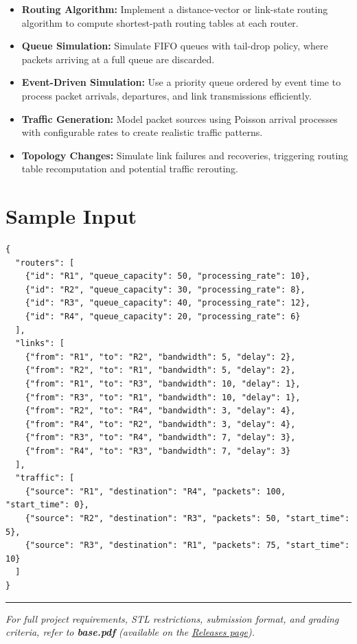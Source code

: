 \begin{itemize}
  \item \textbf{Routing Algorithm:} Implement a distance-vector or link-state routing algorithm to compute shortest-path routing tables at each router.
  \item \textbf{Queue Simulation:} Simulate FIFO queues with tail-drop policy, where packets arriving at a full queue are discarded.
  \item \textbf{Event-Driven Simulation:} Use a priority queue ordered by event time to process packet arrivals, departures, and link transmissions efficiently.
  \item \textbf{Traffic Generation:} Model packet sources using Poisson arrival processes with configurable rates to create realistic traffic patterns.
  \item \textbf{Topology Changes:} Simulate link failures and recoveries, triggering routing table recomputation and potential traffic rerouting.
\end{itemize}

\section{Sample Input}

\begin{lstlisting}[style=json, caption={data/input\_sample.json}]
{
  "routers": [
    {"id": "R1", "queue_capacity": 50, "processing_rate": 10},
    {"id": "R2", "queue_capacity": 30, "processing_rate": 8},
    {"id": "R3", "queue_capacity": 40, "processing_rate": 12},
    {"id": "R4", "queue_capacity": 20, "processing_rate": 6}
  ],
  "links": [
    {"from": "R1", "to": "R2", "bandwidth": 5, "delay": 2},
    {"from": "R2", "to": "R1", "bandwidth": 5, "delay": 2},
    {"from": "R1", "to": "R3", "bandwidth": 10, "delay": 1},
    {"from": "R3", "to": "R1", "bandwidth": 10, "delay": 1},
    {"from": "R2", "to": "R4", "bandwidth": 3, "delay": 4},
    {"from": "R4", "to": "R2", "bandwidth": 3, "delay": 4},
    {"from": "R3", "to": "R4", "bandwidth": 7, "delay": 3},
    {"from": "R4", "to": "R3", "bandwidth": 7, "delay": 3}
  ],
  "traffic": [
    {"source": "R1", "destination": "R4", "packets": 100, "start_time": 0},
    {"source": "R2", "destination": "R3", "packets": 50, "start_time": 5},
    {"source": "R3", "destination": "R1", "packets": 75, "start_time": 10}
  ]
}
\end{lstlisting}

\vfill
\noindent\rule{\textwidth}{0.4pt}
{\small\textit{For full project requirements, STL restrictions, submission format, and grading criteria, refer to \textbf{base.pdf} (available on the \href{https://github.com/BestSithInEU/cse211-term-projects/releases}{Releases page}).}}

